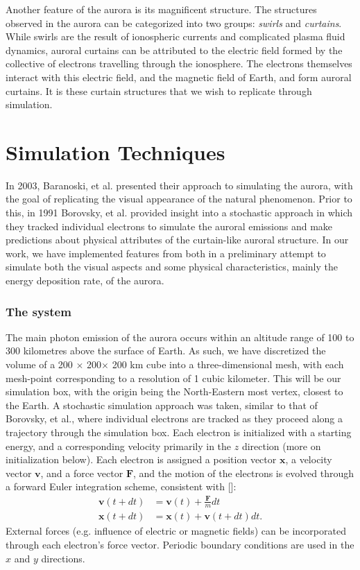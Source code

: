 \documentclass[twocolumn]{article}
\renewcommand{\vec}[1]{\mathbf{#1} }
\begin{document}
Another feature of the aurora is its magnificent structure. The structures observed in the aurora can be categorized into two groups: \emph{swirls} and \emph{curtains}.  While swirls are the result of ionospheric currents and complicated plasma fluid dynamics\cite{Blixt2006,Sandahl2008}, auroral curtains can be attributed to the electric field formed by the collective of electrons travelling through the ionosphere\cite{Baranoski2005}.  The electrons themselves interact with this electric field, and the magnetic field of Earth, and form auroral curtains.  It is these curtain structures that we wish to replicate through simulation.




\section*{{S}imulation {T}echniques}

In 2003, Baranoski\cite{Baranoski2003}, et al. presented their approach to simulating the aurora, with the goal of replicating the visual appearance of the natural phenomenon.  Prior to this, in 1991 Borovsky, \cite{Borovsky1991} et al. provided insight into a stochastic approach in which they tracked individual electrons to simulate the auroral emissions and make predictions about physical attributes of the curtain-like auroral structure.  In our work, we have implemented features from both in a preliminary attempt to simulate both the visual aspects and some physical characteristics, mainly the energy deposition rate, of the aurora.

\subsubsection*{The system}

The main photon emission of the aurora occurs within an altitude range of 100 to 300 kilometres above the surface of Earth\cite{Campbell1961,Baranoski2003}.
As such, we have discretized the volume of a 200 $\times$ 200$\times$ 200 km cube into a three-dimensional mesh, with each mesh-point corresponding to a resolution of 1 cubic kilometer.  This will be our simulation box, with the origin being the North-Eastern most vertex, closest to the Earth. A stochastic simulation approach was taken, similar to that of Borovsky, \cite{Borovsky1991} et al., where individual electrons are tracked as they proceed along a trajectory through the simulation box. Each electron is initialized with a starting energy, and a corresponding velocity primarily in the $z$ direction (more on initialization below).  Each electron is assigned a position vector $\vec x$, a velocity vector $\vec v$, and a force vector $\vec F$, and the motion of the electrons is evolved through a forward Euler integration scheme, consistent with []:
\begin{align}
\vec v (t + dt) &= \vec v(t) + \frac{\vec F}{m} dt \\
\vec x(t + dt) &= \vec x (t)  + \vec v(t+dt) dt .  
\end{align}
External forces (e.g. influence of electric or magnetic fields) can be incorporated through each electron's force vector.
Periodic boundary conditions are used in the $x$ and $y$ directions.
\end{document}

